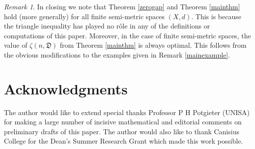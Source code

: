 \documentclass[10pt]{amsart}
\theoremstyle{definition}
\theoremstyle{remark}
\newtheorem{rem}[thm]{Remark}
\begin{document}
\begin{rem}\label{lastrem}
In closing we note that Theorem \ref{zerogap} and Theorem \ref{mainthm} hold (more generally) for all
finite semi-metric spaces $(X,d)$. This is because the triangle inequality has played no r\^{o}le in any
of the definitions or computations of this paper. Moreover, in the case of finite semi-metric spaces,
the value of $\zeta(n, \mathfrak{D})$ from Theorem \ref{mainthm} is always optimal. This follows from
the obvious modifications to the examples given in Remark \ref{mainexample}.
\end{rem}

\section*{Acknowledgments}
The author would like to extend special thanks Professor P H Potgieter
(UNISA) for making a large number of incisive mathematical and editorial
comments on preliminary drafts of this paper. The author would also like
to thank Canisius College for the Dean's Summer Research Grant which
made this work possible.


\end{document}
